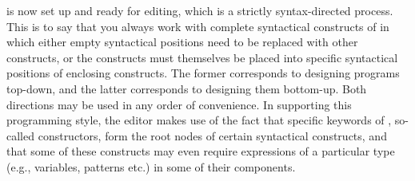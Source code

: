 \pired is now set up and ready for editing, which is a strictly {\mys syntax-directed
process}. This is to say that you always work with complete {\mys syntactical
constructs} of \kir in which either empty
{\mys syntactical positions} need to be replaced 
with other constructs, or the constructs must themselves be placed into
specific syntactical positions of enclosing constructs. The former corresponds
 to designing programs {\mys top-down}, and the latter corresponds to designing them
{\mys bottom-up}. Both directions may be used in any order of convenience. In 
supporting this programming style, the editor makes use of the fact that 
specific {\mys keywords} of \kir, so-called {\mys constructors}, form the root nodes
of certain {\mys syntactical constructs}, and that some of these constructs may
 even require expressions
of a particular type (e.g., variables, patterns etc.)
in some of their components.

